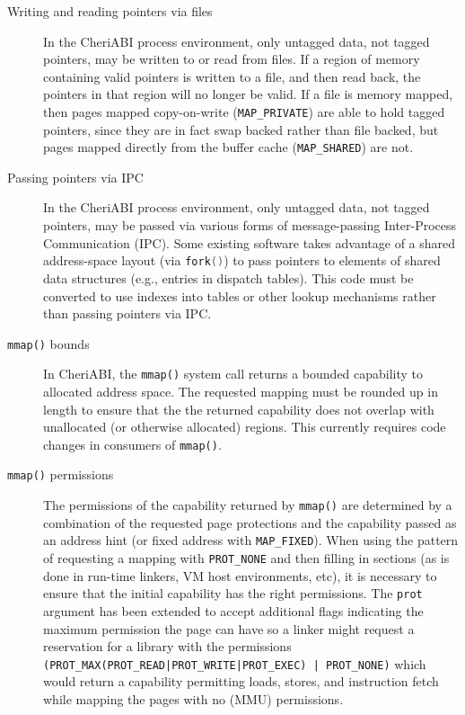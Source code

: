 \documentclass[11pt]{article}
\newcommand{\ccode}[1]{\lstinline[language={C},basicstyle=\small\ttfamily]{#1}}
\newcommand{\cfunc}[1]{\ccode{#1()}}
\begin{document}
\begin{description}
\item[Writing and reading pointers via files] In the CheriABI process
  environment, only untagged data, not tagged pointers, may be written to or
  read from files.
  If a region of memory containing valid pointers is written to a file, and
  then read back, the pointers in that region will no longer be valid.
  If a file is memory mapped, then pages mapped copy-on-write
  (\texttt{MAP\_PRIVATE}) are able to hold tagged pointers, since they are in
  fact swap backed rather than file backed, but pages mapped directly from the
  buffer cache (\texttt{MAP\_SHARED}) are not.

\item[Passing pointers via IPC] In the CheriABI process environment, only
  untagged data, not tagged pointers, may be passed via various forms of
  message-passing Inter-Process Communication (IPC).
  Some existing software takes advantage of a shared address-space layout
  (via \cfunc{fork}) to pass pointers to elements of shared data structures
  (e.g., entries in dispatch tables).
  This code must be converted to use indexes into tables or other lookup
  mechanisms rather than passing pointers via IPC.

\item[\texttt{mmap()} bounds] In CheriABI, the \texttt{mmap()} system
   call returns a bounded capability to allocated address space.
   The requested mapping must be rounded up in length to ensure that the
   the returned capability does not overlap with unallocated (or otherwise
   allocated) regions.
   This currently requires code changes in consumers of \texttt{mmap()}.

\item[\texttt{mmap()} permissions] The permissions of the capability
   returned by \texttt{mmap()} are determined by a combination of the
   requested page protections and the capability passed as an address hint
   (or fixed address with \texttt{MAP\_FIXED}).
   When using the pattern of requesting a mapping with \texttt{PROT\_NONE}
   and then filling in sections (as is done in run-time linkers, VM host
   environments, etc), it is necessary to ensure that the initial
   capability has the right permissions.
   The \texttt{prot} argument has been extended to accept additional
   flags indicating the maximum permission the page can have so a
   linker might request a reservation for a library with the permissions
   \texttt{(PROT\_MAX(PROT\_READ|PROT\_WRITE|PROT\_EXEC) | PROT\_NONE)} which
   would return a capability permitting loads, stores, and instruction
   fetch while mapping the pages with no (MMU) permissions.
\end{description}
\end{document}
